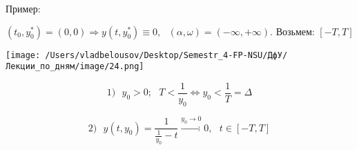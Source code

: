 \documentclass[12pt, a4paper]{report}
\begin{document}
Пример: 

\[ (t_0, y_0 ^* ) = (0,0 ) \Rightarrow y (t, y_0 ^* ) \equiv 0 , \text{ } (\alpha , \omega ) = (-\infty , + \infty  ). \text{ Возьмем: } [-T, T]  \] 

\begin{center}
    \texttt{[image: /Users/vladbelousov/Desktop/Semestr\_4-FP-NSU/ДфУ/Лекции\_по\_дням/image/24.png]}
\end{center} 
\[ 1) \text{ } y_0 > 0 ;\text{ }  T < \frac{1}{y_0 } \Leftrightarrow y_0 < \frac{1}{T } =\Delta  \] 

\[ 2) \text{ } y(t,y_0 )= \frac{1}{\frac{1}{y_0 } - t    } \xrightarrow{y_0 \to  0 } 0 , \text{  }  t \in [-T,T]    \] 


\ifdefined\mainfile
\else
    
\end{document}
